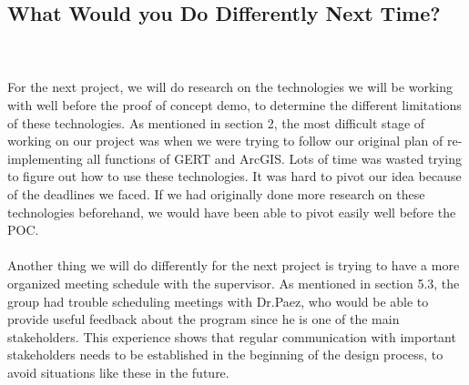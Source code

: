 \documentclass{article}
\begin{document}
\subsection{What Would you Do Differently Next Time?}



\\ \\
For the next project, we will do research on the technologies we will be working with well before the proof of concept demo, to determine the different limitations of these technologies. As mentioned in section 2, the most difficult stage of working on our project was when we were trying to follow our original plan of re-implementing all functions of GERT and ArcGIS. Lots of time was wasted trying to figure out how to use these technologies. It was hard to pivot our idea because of the deadlines we faced. If we had originally done more research on these technologies beforehand, we would have been able to pivot easily well before the POC.
\\ \\ 
Another thing we will do differently for the next project is trying to have a more organized meeting schedule with the supervisor. As mentioned in section 5.3, the group had trouble scheduling meetings with Dr.Paez, who would be able to provide useful feedback about the program since he is one of the main stakeholders. This experience shows that regular communication with important stakeholders needs to be established in the beginning of the design process, to avoid situations like these in the future.
\end{document}
